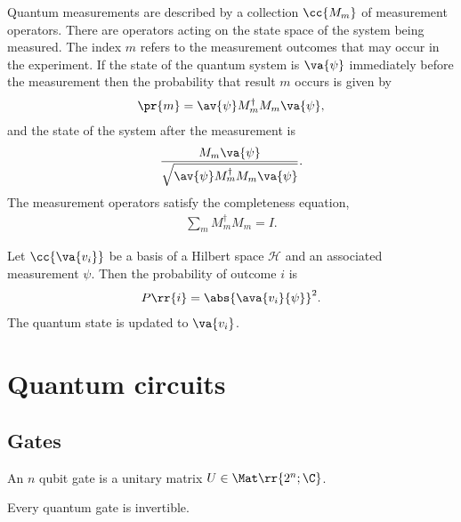 \documentclass{article}
\begin{document}
\begin{axiom}
  Quantum measurements are described by a collection $\cc{M_m}$ of measurement operators.
  There are operators acting on the state space of the system being measured. The index $m$
  refers to the measurement outcomes that may occur in the experiment. If the state of the
  quantum system is $\va{\psi}$ immediately before the measurement then the probability
  that result $m$ occurs is given by
  \begin{align*}
    \pr{m}=\av{\psi}M_m^\dagger M_m \va{\psi},
  \end{align*}
  and the state of the system after the measurement is
  \begin{align*}
    \frac{M_m \va{\psi}}{\sqrt{\av{\psi}M_m^\dagger M_m \va{\psi}}}.
  \end{align*}
  The measurement operators satisfy the completeness equation,
  \begin{align*}
    \sum_{m} M_m^\dagger M_m = I.
  \end{align*}
\end{axiom}

\begin{theorem}
  \label{thm:probability-of-outcome}
  Let $\cc{\va{v_i}}$ be a basis of a Hilbert space $\mathcal{H}$ and an associated measurement $\psi$.
  Then the probability of outcome $i$ is
  \begin{align*}
    P\rr{i} = \abs{\ava{v_i}{\psi}}^2.
  \end{align*}
  The quantum state is updated to $\va{v_i}$.
\end{theorem}

\section{Quantum circuits}
\label{sec:circuits}

\subsection{Gates}
\label{sec:gates}

\begin{definition}
  \label{def:single-qubit-gates}
  An $n$ qubit gate is a unitary matrix $U\in\Mat\rr{2^n;\C}$.
\end{definition}

\begin{corollary}
  Every quantum gate is invertible.
\end{corollary}
\end{document}
